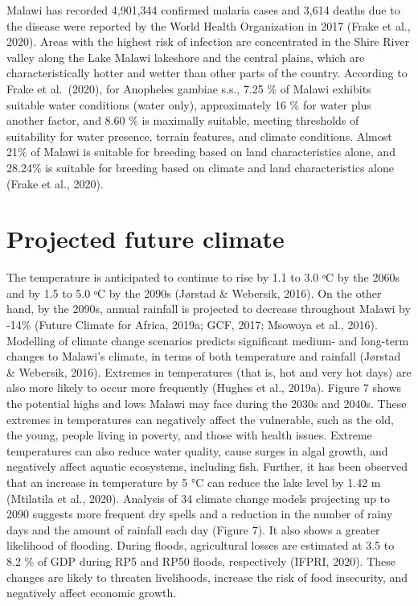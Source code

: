\documentclass[
]{book}
\begin{document}
Malawi has recorded 4,901,344 confirmed malaria cases and 3,614 deaths due to the disease were reported by the World Health Organization in 2017 (Frake et al., 2020). Areas with the highest risk of infection are concentrated in the Shire River valley along the Lake Malawi lakeshore and the central plains, which are characteristically hotter and wetter than other parts of the country. According to Frake et al.~(2020), for Anopheles gambiae s.s., 7.25 \% of Malawi exhibits suitable water conditions (water only), approximately 16 \% for water plus another factor, and 8.60 \% is maximally suitable, meeting thresholds of suitability for water presence, terrain features, and climate conditions. Almost 21\% of Malawi is suitable for breeding based on land characteristics alone, and 28.24\% is suitable for breeding based on climate and land characteristics alone (Frake et al., 2020).

\hypertarget{projected-future-climate}{%
\section{Projected future climate}\label{projected-future-climate}}

The temperature is anticipated to continue to rise by 1.1 to 3.0 ᵒC by the 2060s and by 1.5 to 5.0 ᵒC by the 2090s (Jørstad \& Webersik, 2016). On the other hand, by the 2090s, annual rainfall is projected to decrease throughout Malawi by -14\% (Future Climate for Africa, 2019a; GCF, 2017; Msowoya et al., 2016). Modelling of climate change scenarios predicts significant medium- and long-term changes to Malawi's climate, in terms of both temperature and rainfall (Jørstad \& Webersik, 2016). Extremes in temperatures (that is, hot and very hot days) are also more likely to occur more frequently (Hughes et al., 2019a). Figure 7 shows the potential highs and lows Malawi may face during the 2030s and 2040s. These extremes in temperatures can negatively affect the vulnerable, such as the old, the young, people living in poverty, and those with health issues. Extreme temperatures can also reduce water quality, cause surges in algal growth, and negatively affect aquatic ecosystems, including fish. Further, it has been observed that an increase in temperature by 5 °C can reduce the lake level by 1.42 m (Mtilatila et al., 2020). Analysis of 34 climate change models projecting up to 2090 suggests more frequent dry spells and a reduction in the number of rainy days and the amount of rainfall each day (Figure 7). It also shows a greater likelihood of flooding. During floods, agricultural losses are estimated at 3.5 to 8.2 \% of GDP during RP5 and RP50 floods, respectively (IFPRI, 2020). These changes are likely to threaten livelihoods, increase the risk of food insecurity, and negatively affect economic growth.
\end{document}
